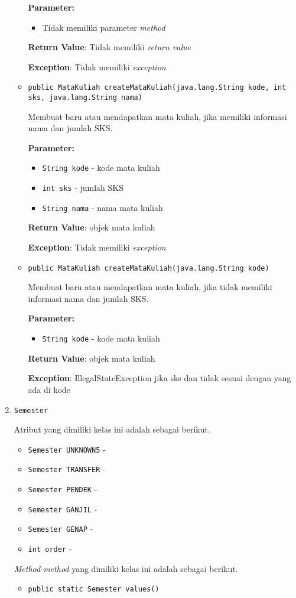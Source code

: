 \documentclass{article}
\begin{document}
\begin{enumerate}
\begin{itemize}
\textbf{Parameter:}
\begin{itemize}
\item Tidak memiliki parameter \textit{method}
\end{itemize}
\textbf{Return Value}: Tidak memiliki \textit{return value}

\textbf{Exception}: Tidak memiliki \textit{exception}

\item \texttt{public MataKuliah createMataKuliah(java.lang.String kode, int sks, java.lang.String nama)}

Membuat baru atau mendapatkan mata kuliah, jika memiliki informasi
 nama dan jumlah SKS.

\textbf{Parameter:}
\begin{itemize}
\item \texttt{String kode} - 
kode mata kuliah
\item \texttt{int sks} - 
jumlah SKS
\item \texttt{String nama} - 
nama mata kuliah
\end{itemize}
\textbf{Return Value}: objek mata kuliah

\textbf{Exception}: Tidak memiliki \textit{exception}

\item \texttt{public MataKuliah createMataKuliah(java.lang.String kode)}

Membuat baru atau mendapatkan mata kuliah, jika tidak memiliki informasi
 nama dan jumlah SKS.

\textbf{Parameter:}
\begin{itemize}
\item \texttt{String kode} - 
kode mata kuliah
\end{itemize}
\textbf{Return Value}: objek mata kuliah

\textbf{Exception}: IllegalStateException
             jika sks dan tidak sesuai dengan yang ada di kode

\end{itemize}
\item \texttt{Semester}



Atribut yang dimiliki kelas ini adalah sebagai berikut.
\begin{itemize}
\item \texttt{Semester UNKNOWN5} - 
\item \texttt{Semester TRANSFER} - 
\item \texttt{Semester PENDEK} - 
\item \texttt{Semester GANJIL} - 
\item \texttt{Semester GENAP} - 
\item \texttt{int order} - 
\end{itemize}
\textit{Method-method} yang dimiliki kelas ini adalah sebagai berikut.
\begin{itemize}
\item \texttt{public static Semester values()}




\end{itemize}
\end{enumerate}
\end{document}
